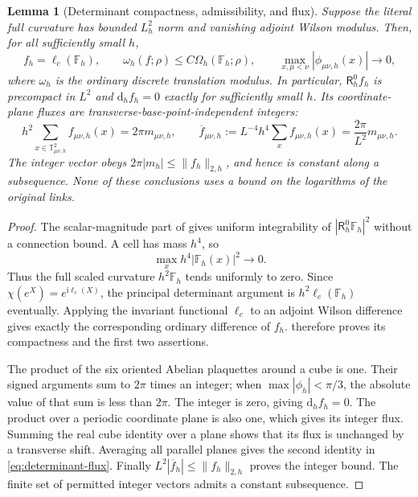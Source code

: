 \documentclass[11pt]{article}
\numberwithin{equation}{section}
\newtheorem{lemma}[lemma]{Lemma}
\theoremstyle{definition}
\theoremstyle{remark}
\newcommand{\dd}{\mathrm d}
\newcommand{\ii}{\mathrm i}
\newcommand{\norm}[1]{\lVert#1\rVert}
\begin{document}
\begin{lemma}[Determinant compactness, admissibility, and flux]
\label{lem:determinant-screen-flux}
Suppose the literal full curvature has bounded $L_h^2$ norm and vanishing
adjoint Wilson modulus.  Then, for all sufficiently small $h$,
\begin{equation}
 f_h=\ell_c(\mathbb F_h),\qquad
 \omega_h(f;\rho)\le C\Omega_h(\mathbb F_h;\rho),\qquad
 \max_{x,\mu<\nu}|\phi_{\mu\nu,h}(x)|\longrightarrow0,
 \label{eq:determinant-inherited-screen}
\end{equation}
where $\omega_h$ is the ordinary discrete translation modulus.  In
particular, $\mathsf R_h^0f_h$ is precompact in $L^2$ and
$\dd_h f_h=0$ exactly for sufficiently small $h$.  Its coordinate-plane
fluxes are transverse-base-point-independent integers:
\begin{equation}
 h^2\sum_{x\in\mathbb T^2_{\mu\nu,h}} f_{\mu\nu,h}(x)
       =2\pi m_{\mu\nu,h},\qquad
 \overline f_{\mu\nu,h}
       :=L^{-4}h^4\sum_x f_{\mu\nu,h}(x)
       =\frac{2\pi}{L^2}m_{\mu\nu,h}.
 \label{eq:determinant-flux}
\end{equation}
The integer vector obeys $2\pi|m_h|\le\norm{f_h}_{2,h}$, and hence is
constant along a subsequence.  None of these conclusions uses a bound on
the logarithms of the original links.
\end{lemma}
\begin{proof}
The scalar-magnitude part of  gives
uniform integrability of $|\mathsf R_h^0\mathbb F_h|^2$ without a connection
bound.  A cell has mass $h^4$, so
\[
 \max_x h^4|\mathbb F_h(x)|^2\longrightarrow0.
\]
Thus the full scaled curvature $h^2\mathbb F_h$ tends uniformly to zero.
Since $\chi(e^X)=e^{\ii\ell_c(X)}$, the principal determinant argument is
$h^2\ell_c(\mathbb F_h)$ eventually.  Applying the invariant functional
$\ell_c$ to an adjoint Wilson difference gives exactly the corresponding
ordinary difference of $f_h$.   therefore
proves its compactness and the first two assertions.

The product of the six oriented Abelian plaquettes around a cube is one.
Their signed arguments sum to $2\pi$ times an integer; when
$\max|\phi_h|<\pi/3$, the absolute value of that sum is less than $2\pi$.
The integer is zero, giving $\dd_hf_h=0$.  The product over a periodic
coordinate plane is also one, which gives its integer flux.  Summing the
real cube identity over a plane shows that its flux is unchanged by a
transverse shift.  Averaging all parallel planes gives the second identity
in \eqref{eq:determinant-flux}.  Finally
$L^2|\overline f_h|\le\norm{f_h}_{2,h}$ proves the integer bound.  The
finite set of permitted integer vectors admits a constant subsequence.
\end{proof}
\end{document}
